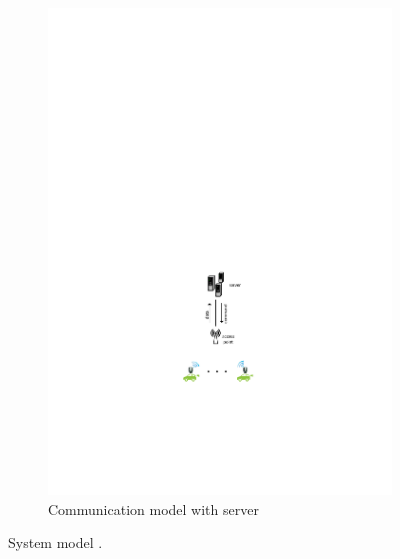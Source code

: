 \documentclass[journal]{IEEEtran}
\begin{document}
\begin{figure}
\begin{subfigure}[b]{0.29\textwidth}
\begin{center}
						\includegraphics[width=\textwidth]{model-b.pdf}
						\caption{Communication model with server}
						\label{fig:model-b}
					\end{center}
				\end{subfigure}%
\caption{System model \cite{lee2016adaptive}.} 
\label{fig:slackness1}
\endminipage
\end{figure}
\end{document}
